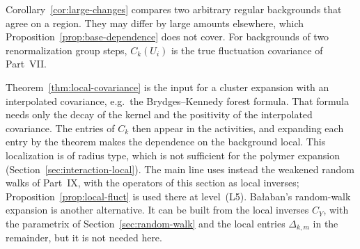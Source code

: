 Corollary~\ref{cor:large-changes} compares two arbitrary regular backgrounds that agree on a region. They may differ by large amounts elsewhere, which Proposition~\ref{prop:base-dependence} does not cover. For backgrounds of two renormalization group steps, $C_k(U_i)$ is the true fluctuation covariance of Part~VII.

\begin{remark}\label{x:37.9}
Theorem~\ref{thm:local-covariance} is the input for a cluster expansion with an interpolated covariance, e.g.\ the Brydges--Kennedy forest formula. That formula needs only the decay of the kernel and the positivity of the interpolated covariance. The entries of $C_k$ then appear in the activities, and expanding each entry by the theorem makes the dependence on the background local. This localization is of radius type, which is not sufficient for the polymer expansion (Section~\ref{sec:interaction-local}). The main line uses instead the weakened random walks of Part~IX, with the operators of this section as local inverses; Proposition~\ref{prop:local-fluct} is used there at level~(L5). Ba\l aban's random-walk expansion \cite{BalBackground} is another alternative. It can be built from the local inverses $C_Y$, with the parametrix of Section~\ref{sec:random-walk} and the local entries $\Delta_{k,m}$ in the remainder, but it is not needed here.
\end{remark}
